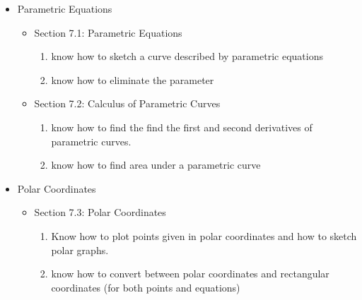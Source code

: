 \documentclass[11pt,fleqn]{article}
\begin{document}
\begin{itemize}
\item Parametric Equations
	\begin{itemize}
	\item Section 7.1: Parametric Equations

		\begin{enumerate}
		\item know how to sketch a curve described by parametric equations
		\item know how to eliminate the parameter
		\end{enumerate}
		
	\item Section 7.2: Calculus of Parametric Curves
	
		\begin{enumerate}
		\item know how to find the find the first and second derivatives of parametric curves.
		\item know how to find area under a parametric curve
		\end{enumerate}
	\end{itemize}
		
\item Polar Coordinates

	\begin{itemize}
	\item Section 7.3: Polar Coordinates
		\begin{enumerate}
		\item Know how to plot points given in polar coordinates and how to sketch polar graphs.
		\item know how to convert between polar coordinates and rectangular coordinates (for both points and equations)
		\end{enumerate}
	
		
	\end{itemize}
	
\end{itemize}
\end{document}
